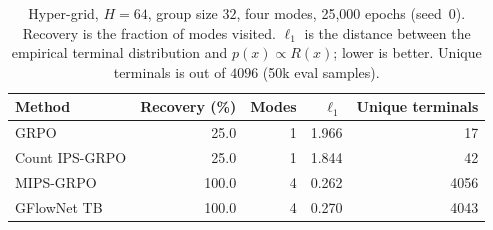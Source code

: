\begin{table}[htbp]
\centering
\caption{Hyper-grid, $H=64$, group size $32$, four modes, 25{,}000 epochs (seed~0).
Recovery is the fraction of modes visited. $\ell_1$ is the distance between the
empirical terminal distribution and $p(x) \propto R(x)$; lower is better. Unique
terminals is out of $4096$ (50k eval samples).}
\label{tab:grid}
\begin{tabular}{lrrrr}
\toprule
Method & Recovery (\%) & Modes & $\ell_1$ & Unique terminals \\
\midrule
GRPO                     & 25.0  & 1 & 1.966 & 17 \\
Count IPS-GRPO           & 25.0  & 1 & 1.844 & 42 \\
MIPS-GRPO                & 100.0 & 4 & 0.262 & 4056 \\
GFlowNet TB              & 100.0 & 4 & 0.270 & 4043 \\
\bottomrule
\end{tabular}
\end{table}
